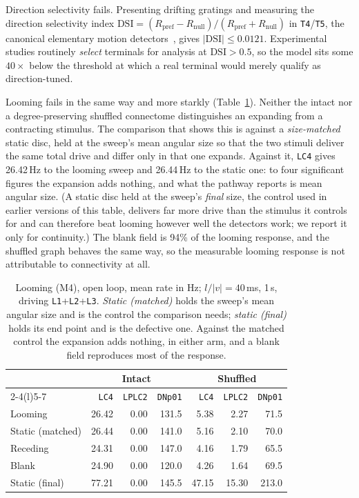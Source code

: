 \documentclass[10pt,twoside]{article}
\newcommand{\cell}[1]{\texttt{#1}}
\begin{document}
Direction selectivity fails. Presenting drifting gratings and measuring the
direction selectivity index
$\mathrm{DSI}=(R_{\mathrm{pref}}-R_{\mathrm{null}})/(R_{\mathrm{pref}}+R_{\mathrm{null}})$
in \cell{T4}/\cell{T5}, the canonical elementary motion
detectors~\citep{maisak2013}, gives $|\mathrm{DSI}|\leq0.0121$. Experimental
studies routinely \emph{select} terminals for analysis at $\mathrm{DSI}>0.5$,
so the model sits some $40\times$ below the threshold at which a real
terminal would merely qualify as direction-tuned.

Looming fails in the same way and more starkly (Table~\ref{tab:looming}).
Neither the intact nor a degree-preserving shuffled connectome distinguishes an
expanding from a contracting stimulus. The comparison that shows this is
against a \emph{size-matched} static disc, held at the sweep's mean angular
size so that the two stimuli deliver the same total drive and differ only in
that one expands. Against it, \cell{LC4} gives 26.42\,Hz to the looming sweep
and 26.44\,Hz to the static one: to four significant figures the expansion adds
nothing, and what the pathway reports is mean angular size. (A static disc held
at the sweep's \emph{final} size, the control used in earlier versions of this
table, delivers far more drive than the stimulus it controls for and can
therefore beat looming however well the detectors work; we report it only for
continuity.) The blank field is 94\% of the looming response, and the shuffled
graph behaves the same way, so the measurable looming response is not
attributable to connectivity at all.

\begin{table}[t]\centering\small
\caption{Looming (M4), open loop, mean rate in Hz; $l/|v|=40$\,ms, 1\,s,
driving \cell{L1}+\cell{L2}+\cell{L3}. \emph{Static (matched)} holds the
sweep's mean angular size and is the control the comparison needs; \emph{static
(final)} holds its end point and is the defective one. Against the matched
control the expansion adds nothing, in either arm, and a blank field
reproduces most of the response.}
\label{tab:looming}
\begin{tabular}{lrrr@{\hskip 2em}rrr}
\toprule
& \multicolumn{3}{c}{\bf Intact} & \multicolumn{3}{c}{\bf Shuffled}\\
\cmidrule(r){2-4}\cmidrule(l){5-7}
& \cell{LC4} & \cell{LPLC2} & \cell{DNp01} & \cell{LC4} & \cell{LPLC2} & \cell{DNp01}\\
\midrule
Looming           & 26.42 & 0.00 & 131.5 & 5.38 & 2.27 & 71.5\\
Static (matched)  & 26.44 & 0.00 & 141.0 & 5.16 & 2.10 & 70.0\\
Receding          & 24.31 & 0.00 & 147.0 & 4.16 & 1.79 & 65.5\\
Blank             & 24.90 & 0.00 & 120.0 & 4.26 & 1.64 & 69.5\\
\addlinespace
Static (final)    & 77.21 & 0.00 & 145.5 & 47.15 & 15.30 & 213.0\\
\bottomrule
\end{tabular}
\end{table}
\end{document}
